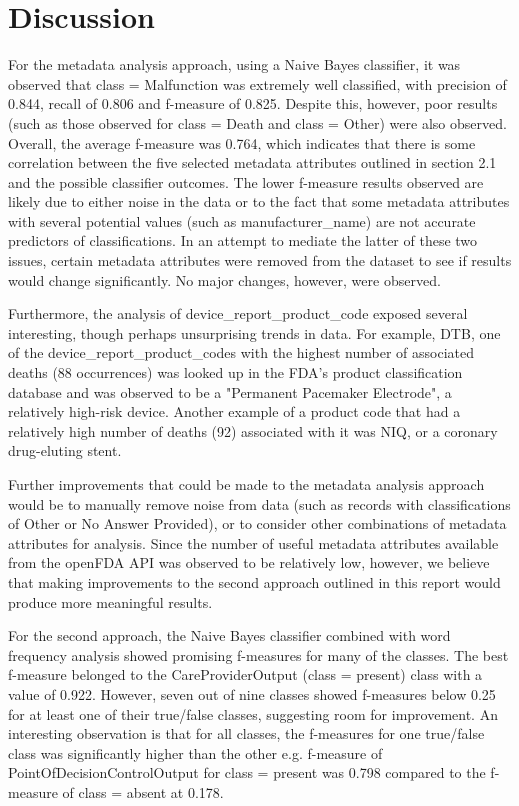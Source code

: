 \documentclass[11pt, notitlepage,abstracton,oneside]{article}   	%
\begin{document}
\section{Discussion}

For the metadata analysis approach, using a Naive Bayes classifier, it was observed that class = Malfunction was extremely well classified, with precision of 0.844, recall of 0.806 and f-measure of 0.825. Despite this, however, poor results (such as those observed for class = Death and class = Other) were also observed. Overall, the average f-measure was 0.764, which indicates that there is some correlation between the five selected metadata attributes outlined in section 2.1 and the possible classifier outcomes. The lower f-measure results observed are likely due to either noise in the data or to the fact that some metadata attributes with several potential values (such as manufacturer\_name) are not accurate predictors of classifications. In an attempt to mediate the latter of these two issues, certain metadata attributes were removed from the dataset to see if results would change significantly. No major changes, however, were observed.

Furthermore, the analysis of device\_report\_product\_code exposed several interesting, though perhaps unsurprising trends in data. For example, DTB, one of the device\_report\_product\_codes with the highest number of associated deaths (88 occurrences) was looked up in the FDA's product classification database and was observed to be a "Permanent Pacemaker Electrode", a relatively high-risk device. Another example of a product code that had a relatively high number of deaths (92) associated with it was NIQ, or a coronary drug-eluting stent.

Further improvements that could be made to the metadata analysis approach would be to manually remove noise from data (such as records with classifications of Other or No Answer Provided), or to consider other combinations of metadata attributes for analysis. Since the number of useful metadata attributes available from the openFDA API was observed to be relatively low, however, we believe that making improvements to the second approach outlined in this report would produce more meaningful results.

For the second approach, the Naive Bayes classifier combined with word frequency analysis showed promising f-measures for many of the classes. The best f-measure belonged to the CareProviderOutput (class = present) class with a value of 0.922. However, seven out of nine classes showed f-measures below 0.25 for at least one of their true/false classes, suggesting room for improvement. An interesting observation is that for all classes, the f-measures for one true/false class was significantly higher than the other e.g. f-measure of PointOfDecisionControlOutput for class = present was 0.798 compared to the f-measure of class = absent at 0.178.
\end{document}
